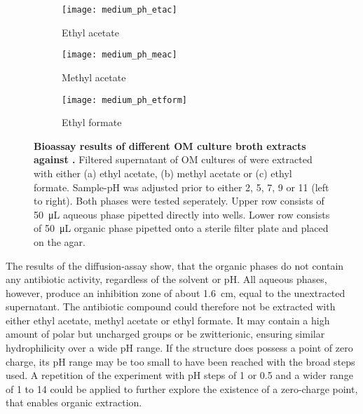 \begin{figure}[htbp]
	\centering
	\begin{subfigure}{\textwidth}
		\captionsetup{singlelinecheck = false, format= hang, justification=raggedright, font=footnotesize, labelsep=space}
		\centering
		\texttt{[image: medium\_ph\_etac]}
		\caption{Ethyl acetate}
	\end{subfigure}
	\begin{subfigure}{\textwidth}
		\centering
		\texttt{[image: medium\_ph\_meac]}
		\caption{Methyl acetate}
	\end{subfigure}
	\begin{subfigure}{\textwidth}
		\centering
		\texttt{[image: medium\_ph\_etform]}
		\caption{Ethyl formate}
	\end{subfigure}
	\caption[Bioassay results of different OM culture broth extracts against \coli]{%
		\textbf{Bioassay results of different OM culture broth extracts against \coli{}.} Filtered supernatant of OM cultures of \tue were extracted with either (a) ethyl acetate, (b) methyl acetate or (c) ethyl formate.
    	Sample-pH was adjusted prior to either 2, 5, 7, 9 or 11 (left to right).
    	Both phases were tested seperately.
    	Upper row consists of \SI{50}{\micro\liter} aqueous phase pipetted directly into wells.
    	Lower row consists of \SI{50}{\micro\liter} organic phase pipetted onto a sterile filter plate and placed on the agar.}
	\label{fig:results_extraction_bioassay}
\end{figure}

The results of the diffusion-assay show, that the organic phases do not contain any antibiotic activity, regardless of the solvent or pH.
All aqueous phases, however, produce an inhibition zone of about \SI{1.6}{\centi\meter}, equal to the unextracted supernatant.
The antibiotic compound could therefore not be extracted with either ethyl acetate, methyl acetate or ethyl formate.
It may contain a high amount of polar but uncharged groups or be zwitterionic, ensuring similar hydrophilicity over a wide pH range.
If the structure does possess a point of zero charge, its pH range may be too small to have been reached with the broad steps used.
A repetition of the experiment with pH steps of 1 or 0.5 and a wider range of 1 to 14 could be applied to further explore the existence of a zero-charge point, that enables organic extraction.

